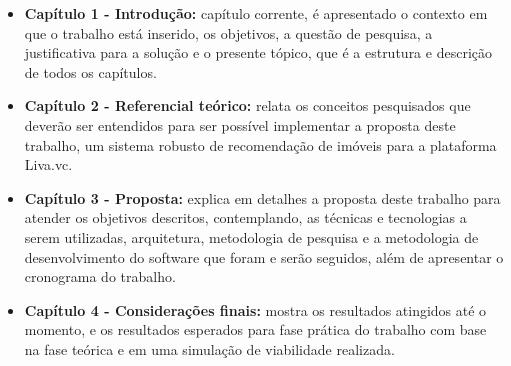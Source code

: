 \begin{itemize}
    \item \textbf{Capítulo 1 - Introdução:} capítulo corrente, é apresentado o contexto em que o trabalho está inserido, os objetivos, a questão de pesquisa, a justificativa para a solução e o presente tópico, que é a estrutura e descrição de todos os capítulos.

    \item \textbf{Capítulo 2 - Referencial teórico:} relata os conceitos pesquisados que deverão ser entendidos para ser possível implementar a proposta deste trabalho, um sistema robusto de recomendação de imóveis para a plataforma Liva.vc.
    
   \item \textbf{Capítulo 3 - Proposta:} explica em detalhes a proposta deste trabalho para atender os objetivos descritos, contemplando, as técnicas e tecnologias a serem utilizadas, arquitetura, metodologia de pesquisa e a metodologia de desenvolvimento do software que foram e serão seguidos, além de apresentar o cronograma do trabalho.
   
   \item \textbf{Capítulo 4 - Considerações finais:} mostra os resultados atingidos até o momento, e os resultados esperados para fase prática do trabalho com base na fase teórica e em uma simulação de viabilidade realizada.
\end{itemize}